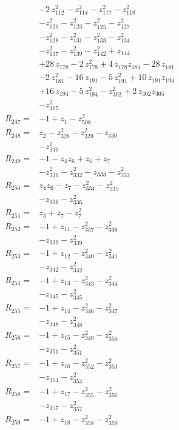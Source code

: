 \begin{align*}
&-2\,z_{112}^{2} -z_{114}^{2} -z_{117}^{2} -z_{118}^{2}\\
&-z_{121}^{2} -z_{123}^{2} -z_{125}^{2} -z_{127}^{2}\\
&-z_{128}^{2} -z_{131}^{2} -z_{133}^{2} -z_{134}^{2}\\
&-z_{137}^{2} -z_{139}^{2} -z_{142}^{2} +z_{144}\\
&+28\,z_{178} -2\,z_{178}^{2} +4\,z_{178}z_{181} -28\,z_{181}\\
&-2\,z_{181}^{2} -16\,z_{191} -5\,z_{191}^{2} +10\,z_{191}z_{194}\\
&+16\,z_{194} -5\,z_{194}^{2} -z_{302}^{2} +2\,z_{302}z_{305}\\
&-z_{305}^{2}\\[2pt]
R_{247}={}&-1 +z_{1} -z_{508}^{2}\\[2pt]
R_{248}={}&z_{2} -z_{328}^{2} -z_{329}^{2} -z_{330}\\
&-z_{330}^{2}\\[2pt]
R_{249}={}&-1 -z_{4}z_{6} +z_{6} +z_{7}\\
&-z_{331}^{2} -z_{332}^{2} -z_{333} -z_{333}^{2}\\[2pt]
R_{250}={}&z_{4}z_{6} -z_{7} -z_{334}^{2} -z_{335}^{2}\\
&-z_{336} -z_{336}^{2}\\[2pt]
R_{251}={}&z_{3} +z_{7} -z_{7}^{2}\\[2pt]
R_{252}={}&-1 +z_{11} -z_{337}^{2} -z_{338}^{2}\\
&-z_{339} -z_{339}^{2}\\[2pt]
R_{253}={}&-1 +z_{12} -z_{340}^{2} -z_{341}^{2}\\
&-z_{342} -z_{342}^{2}\\[2pt]
R_{254}={}&-1 +z_{13} -z_{343}^{2} -z_{344}^{2}\\
&-z_{345} -z_{345}^{2}\\[2pt]
R_{255}={}&-1 +z_{14} -z_{346}^{2} -z_{347}^{2}\\
&-z_{348} -z_{348}^{2}\\[2pt]
R_{256}={}&-1 +z_{15} -z_{349}^{2} -z_{350}^{2}\\
&-z_{351} -z_{351}^{2}\\[2pt]
R_{257}={}&-1 +z_{16} -z_{352}^{2} -z_{353}^{2}\\
&-z_{354} -z_{354}^{2}\\[2pt]
R_{258}={}&-1 +z_{17} -z_{355}^{2} -z_{356}^{2}\\
&-z_{357} -z_{357}^{2}\\[2pt]
R_{259}={}&-1 +z_{18} -z_{358}^{2} -z_{359}^{2}\\

\end{align*}
